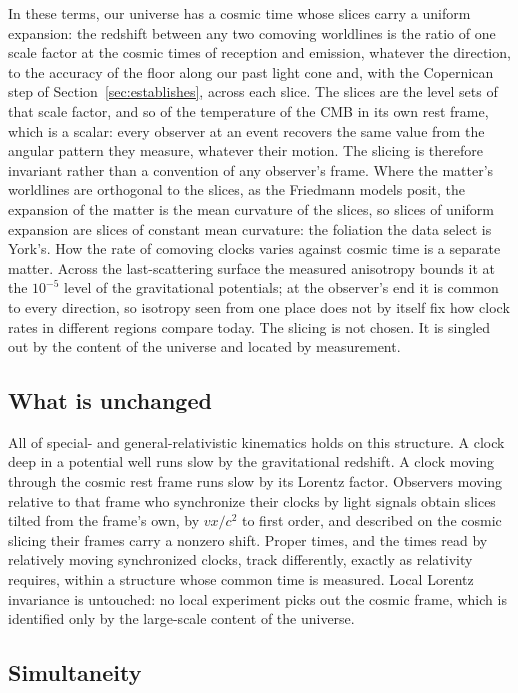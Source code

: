 \documentclass[twocolumn]{aastex701}
\begin{document}
In these terms, our universe has a cosmic time whose slices carry a uniform expansion: the redshift between any two comoving worldlines is the ratio of one scale factor at the cosmic times of reception and emission, whatever the direction, to the accuracy of the floor along our past light cone and, with the Copernican step of Section~\ref{sec:establishes}, across each slice. The slices are the level sets of that scale factor, and so of the temperature of the CMB in its own rest frame, which is a scalar: every observer at an event recovers the same value from the angular pattern they measure, whatever their motion. The slicing is therefore invariant rather than a convention of any observer's frame. Where the matter's worldlines are orthogonal to the slices, as the Friedmann models posit, the expansion of the matter is the mean curvature of the slices, so slices of uniform expansion are slices of constant mean curvature: the foliation the data select is York's. How the rate of comoving clocks varies against cosmic time is a separate matter. Across the last-scattering surface the measured anisotropy bounds it at the $10^{-5}$ level of the gravitational potentials; at the observer's end it is common to every direction, so isotropy seen from one place does not by itself fix how clock rates in different regions compare today. The slicing is not chosen. It is singled out by the content of the universe and located by measurement.

\subsection{What is unchanged}

All of special- and general-relativistic kinematics holds on this structure. A clock deep in a potential well runs slow by the gravitational redshift. A clock moving through the cosmic rest frame runs slow by its Lorentz factor. Observers moving relative to that frame who synchronize their clocks by light signals obtain slices tilted from the frame's own, by $vx/c^{2}$ to first order, and described on the cosmic slicing their frames carry a nonzero shift. Proper times, and the times read by relatively moving synchronized clocks, track differently, exactly as relativity requires, within a structure whose common time is measured. Local Lorentz invariance is untouched: no local experiment picks out the cosmic frame, which is identified only by the large-scale content of the universe.

\subsection{Simultaneity}
\end{document}
